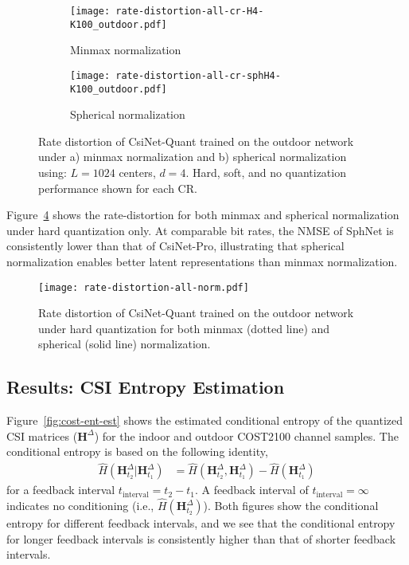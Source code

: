 \begin{figure}[htb] \centering 
	\begin{subfigure}[t]{.48\textwidth}
		\texttt{[image: rate-distortion-all-cr-H4-K100\_outdoor.pdf]}
		\caption{Minmax normalization} 
		\label{fig:rate-distortion-minmax} 
	\end{subfigure}
	\begin{subfigure}[t]{.48\textwidth}
		\texttt{[image: rate-distortion-all-cr-sphH4-K100\_outdoor.pdf]}
		\caption{Spherical normalization} 
		\label{fig:rate-distortion-sph} 
	\end{subfigure}
	\caption{Rate distortion of CsiNet-Quant trained on the outdoor network under a) minmax normalization and b) spherical normalization using: $L=1024$ centers, $d=4$. Hard, soft, and no quantization performance shown for each CR.} 
  	\label{fig:rate-distortion-softquant} 
\end{figure}

Figure~\ref{fig:rate-distortion-norms} shows the rate-distortion for both minmax and spherical normalization under hard quantization only. At comparable bit rates, the NMSE of SphNet is consistently lower than that of CsiNet-Pro, illustrating that spherical normalization enables better latent representations than minmax normalization.

\begin{figure}[htb] \centering 
  \texttt{[image: rate-distortion-all-norm.pdf]}
  \caption{Rate distortion of CsiNet-Quant trained on the outdoor network under hard quantization for both minmax (dotted line) and spherical (solid line) normalization.} 
  \label{fig:rate-distortion-norms} 
\end{figure}

\subsection{Results: CSI Entropy Estimation} \label{sec:results-ent-estimation}

Figure~\ref{fig:cost-ent-est} shows the estimated conditional entropy of the quantized CSI matrices ($\mathbf H^{\Delta}$) for the indoor and outdoor COST2100 channel samples. The conditional entropy is based on the following identity,
\begin{align*}
	\hat H(\mathbf H^\Delta_{t_2} | \mathbf H^\Delta_{t_1}) &= \hat H(\mathbf H^\Delta_{t_2}, \mathbf H^\Delta_{t_1}) - \hat H(\mathbf H^\Delta_{t_1})
\end{align*}
for a feedback interval $t_{\text{interval}} = t_2 - t_1$. A feedback interval of $t_{\text{interval}} = \infty$ indicates no conditioning (i.e., $\hat H(\mathbf H^\Delta_{t_2})$). Both figures show the conditional entropy for different feedback intervals, and we see that the conditional entropy for longer feedback intervals is consistently higher than that of shorter feedback intervals. 

